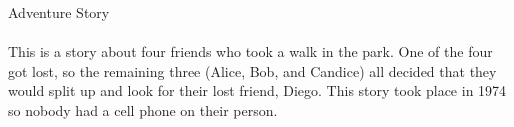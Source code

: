 \documentclass{article}
\begin{document}
\large{Adventure Story} \\ \\
This is a story about four friends who took a walk in the park. One of the four got lost, so the remaining three (Alice, Bob, and Candice) all decided that they would split up and look for their lost friend, Diego. This story took place in 1974 so nobody had a cell phone on their person.\\
\end{document}
